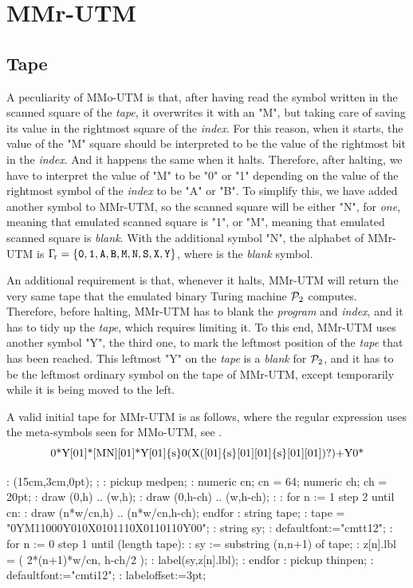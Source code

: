\vfil\break

\section{MMr-UTM}

\subsection{Tape}

A peculiarity of MMo-UTM is that,
after having read the symbol written
in the scanned square of the {\em tape},
it overwrites it with an "M", but taking care of
saving its value in the rightmost square of the {\em index}.
For this reason, when it starts,
 the value of the "M" square should be interpreted
 to be the value of the rightmost bit in the {\em index}.
And it happens the same when it halts.
Therefore, after halting,
 we have to interpret the value of "M" to be "0" or "1"
 depending on the value of the rightmost symbol of the {\em index}
 to be "A" or "B".
To simplify this, we have added another symbol to MMr-UTM,
so the scanned square will be either
 "N", for {\em one}, meaning that emulated scanned square is "1",
 or "M", meaning that emulated scanned square is {\em blank}.
With the additional symbol "N", the alphabet of MMr-UTM is
$\Gamma_{\!\rm r} = \{ \hbox{\tt0}, \hbox{\tt1}, \hbox{\tt A}, \hbox{\tt B}, \hbox{\tt M}, \hbox{\tt N},
 \hbox{\tt S}, \hbox{\tt X}, \hbox{\tt Y} \}$, where  is the {\em blank} symbol.

An additional requirement is that,
whenever it halts, MMr-UTM will return the very same tape that
the emulated binary Turing machine ${\cal P}_2$ computes.
Therefore, before halting, MMr-UTM has to blank
the {\em program} and {\em index}, and it has to tidy up
the {\em tape}, which requires limiting it.
To this end, MMr-UTM uses another symbol "Y", the third one,
to mark the leftmost position of the {\em tape} that has been reached.
This leftmost "Y" on the {\em tape} is a {\em blank} for ${\cal P}_2$,
and it has to be the leftmost ordinary symbol on the tape of MMr-UTM,
except temporarily while it is being moved to the left.

A valid initial tape for MMr-UTM is as follows,
 where the regular expression uses
 the meta-symbols seen for MMo-UTM, see .
$$\catcode`\<=1 \catcode`\>=2 \catcode`\{=12 \catcode`\}=12 \tt
\hbox<0*Y[01]*[MN][01]*Y[01]{s}0(X([01]{s}[01][01]{s}[01][01])?)+Y0*>$$

\MT:
\MTbeginfig(15cm,3cm,0pt);
\MTresetpa;
\MT: pickup medpen;
\MT: numeric cn; cn = 64; numeric ch; ch = 20pt;
\MT: draw (0,h) .. (w,h);
\MT: draw (0,h-ch) .. (w,h-ch);
\MT:
\MT: for n := 1 step 2 until cn:
\MT:  draw (n*w/cn,h) .. (n*w/cn,h-ch); endfor
\MT: string tape;
\MT: tape = "0YM11000Y010X0101110X0110110Y00";
\MT: string sy;
\MT: defaultfont:="cmtt12";
\MT: for n := 0 step 1 until (length tape):
\MT:  sy := substring (n,n+1) of tape;
\MT:  z[n].lbl = ( 2*(n+1)*w/cn, h-ch/2 );
\MT:  label(sy,z[n].lbl);
\MT: endfor
\MT: pickup thinpen;
\MT: defaultfont:="cmti12";
\MT: labeloffset:=3pt;

